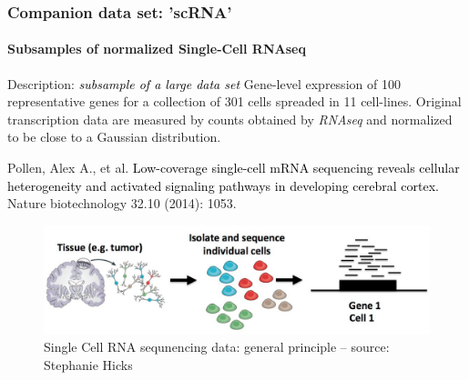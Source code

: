 \documentclass{beamer}\usepackage[]{graphicx}\usepackage[]{color}
\begin{document}
\begin{frame}[fragile]
  \frametitle{Companion data set: 'scRNA'}
  \framesubtitle{Subsamples of normalized Single-Cell RNAseq}

\begin{block}{Description: \textcolor{black}{\it subsample of a large data set}}
\small Gene-level expression of 100 representative genes for a collection of 301 cells 
spreaded in 11 cell-lines. Original transcription data are measured by counts obtained by 
\textit{RNAseq} and normalized to be close to a Gaussian distribution.\\

\begin{scriptsize}
\begin{thebibliography}{9}
 Pollen, Alex A., et al. \textcolor{black}{Low-coverage single-cell mRNA sequencing reveals cellular heterogeneity and activated signaling pathways in developing cerebral cortex.} \newblock Nature biotechnology 32.10 (2014): 1053.
\end{thebibliography}
\end{scriptsize}
\end{block}

\begin{figure}
  \includegraphics[width=.9\textwidth]{figures/scRNA-overview}
  \caption{Single Cell RNA sequnencing data: general principle -- {\tiny source: Stephanie Hicks}}
\end{figure}

\end{frame}
\end{document}
